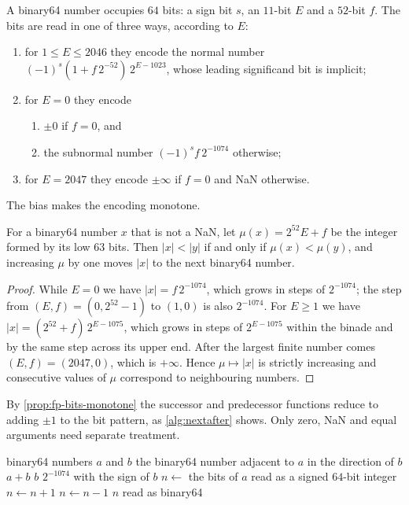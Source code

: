 A binary64 number occupies $64$ bits: a sign bit $s$, an $11$-bit  $E$ and a $52$-bit  $f$. The bits are read in one of three ways, according to $E$:
\begin{enumerate}
\item for $1\le E\le2046$ they encode the normal number $(-1)^s(1+f\,2^{-52})\,2^{E-1023}$, whose leading significand bit is implicit;
\item for $E=0$ they encode
  \begin{enumerate}
  \item $\pm0$ if $f=0$, and
  \item the subnormal number $(-1)^sf\,2^{-1074}$ otherwise;
  \end{enumerate}
\item for $E=2047$ they encode $\pm\infty$ if $f=0$ and NaN otherwise.
\end{enumerate}
The bias makes the encoding monotone.

\begin{proposition}
\label{prop:fp-bits-monotone}
For a binary64 number $x$ that is not a NaN, let $\mu(x)=2^{52}E+f$ be the integer formed by its low $63$ bits. Then $|x|<|y|$ if and only if $\mu(x)<\mu(y)$, and increasing $\mu$ by one moves $|x|$ to the next binary64 number.
\end{proposition}

\begin{proof}
While $E=0$ we have $|x|=f\,2^{-1074}$, which grows in steps of $2^{-1074}$; the step from $(E,f)=(0,2^{52}-1)$ to $(1,0)$ is also $2^{-1074}$. For $E\ge1$ we have $|x|=(2^{52}+f)\,2^{E-1075}$, which grows in steps of $2^{E-1075}$ within the binade and by the same step across its upper end. After the largest finite number comes $(E,f)=(2047,0)$, which is $+\infty$. Hence $\mu\mapsto|x|$ is strictly increasing and consecutive values of $\mu$ correspond to neighbouring numbers.
\end{proof}

By \cref{prop:fp-bits-monotone} the successor and predecessor functions reduce to adding $\pm1$ to the bit pattern, as \cref{alg:nextafter} shows. Only zero, NaN and equal arguments need separate treatment.

\begin{algorithm}
\begin{algorithmic}[1]
\Require binary64 numbers $a$ and $b$
\Ensure the binary64 number adjacent to $a$ in the direction of $b$
 \Return $a+b$ 
\EndIf
{} \Return $b$
\EndIf
{} \Return $2^{-1074}$ with the sign of $b$
\EndIf
\State $n\gets$ the bits of $a$ read as a signed $64$-bit integer
  \State $n\gets n+1$ 
\Else
  \State $n\gets n-1$
\EndIf
\State \Return $n$ read as binary64 
\end{algorithmic}
\caption{The successor function by a step on the bit pattern.}
\label{alg:nextafter}
\end{algorithm}

